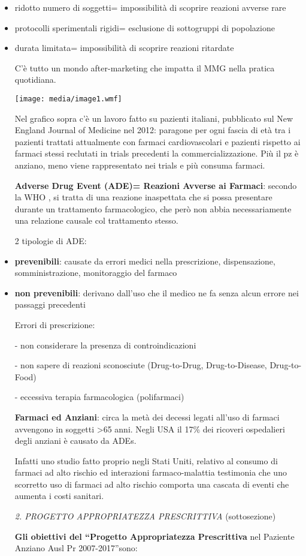 \documentclass[]{article}
\begin{document}
\begin{itemize}
\item
  ridotto numero di soggetti= impossibilità di scoprire reazioni avverse
  rare
\item
  protocolli sperimentali rigidi= esclusione di sottogruppi di
  popolazione
\item
  durata limitata= impossibilità di scoprire reazioni ritardate

  C'è tutto un mondo after-marketing che impatta il MMG nella pratica
  quotidiana.

  \texttt{[image: media/image1.wmf]}

  Nel grafico sopra c'è un lavoro fatto su pazienti italiani, pubblicato
  sul New England Journal of Medicine nel 2012: paragone per ogni fascia
  di età tra i pazienti trattati attualmente con farmaci cardiovascolari
  e pazienti rispetto ai farmaci stessi reclutati in trials precedenti
  la commercializzazione. Più il pz è anziano, meno viene rappresentato
  nei trials e più consuma farmaci.

  \textbf{Adverse Drug Event (ADE)= Reazioni Avverse ai Farmaci}:
  secondo la WHO , si tratta di una reazione inaspettata che si possa
  presentare durante un trattamento farmacologico, che però non abbia
  necessariamente una relazione causale col trattamento stesso.

  2 tipologie di ADE:
\end{itemize}

\begin{itemize}
\item
  \textbf{prevenibili}: causate da errori medici nella prescrizione,
  dispensazione, somministrazione, monitoraggio del farmaco
\item
  \textbf{non prevenibili}: derivano dall'uso che il medico ne fa senza
  alcun errore nei passaggi precedenti

  Errori di prescrizione:

  - non considerare la presenza di controindicazioni

  - non sapere di reazioni sconosciute (Drug-to-Drug, Drug-to-Disease,
  Drug-to-Food)

  - eccessiva terapia farmacologica (polifarmaci)

  \textbf{Farmaci ed Anziani}: circa la metà dei decessi legati all'uso
  di farmaci avvengono in soggetti \textgreater{}65 anni. Negli USA il
  17\% dei ricoveri ospedalieri degli anziani è causato da ADEs.

  Infatti uno studio fatto proprio negli Stati Uniti, relativo al
  consumo di farmaci ad alto rischio ed interazioni farmaco-malattia
  testimonia che uno scorretto uso di farmaci ad alto rischio comporta
  una cascata di eventi che aumenta i costi sanitari.

  \emph{2. PROGETTO APPROPRIATEZZA PRESCRITTIVA} (sottosezione)

  \textbf{Gli obiettivi del ``Progetto Appropriatezza Prescrittiva} nel
  Paziente Anziano Ausl Pr 2007-2017''sono:
\end{itemize}
\end{document}
